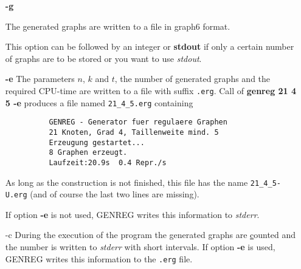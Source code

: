 \documentclass[11pt]{article}
\begin{document}
\begin{itemize}
  as code. 
  To achieve a further compression of the data, we compare
  the code of the next graph to be constructed with the 
  preceeding and find out, in how many entries at the begining
  the two codes are equal. Instead of writing the common
  pieces twice on the file, we only store its length and
  then the differing entries. Thus as first entry of the file
  we always have zero. The 4-regular graphs on 7 vertices
  have the codes 
  
  \hspace{1cm} {\tt 2 3 4 5 3 4 5 6 7 6 7 6 7 7} and

  \hspace{1cm} {\tt 2 3 4 5 3 4 6 5 7 6 7 6 7 7}

  The file {\bf \verb|07_4_3.scd|} consists of 

  \hspace{1cm}{\tt 0 2 3 4 5 3 4 5 6 7 6 7 6 7 7 6 6 5 7 6 7 6 7 7}

  and has length of 24 byte. This kind of compression gets better for
  big $n$ or $t>3$. The program {\em readscd.c}  contains easy functions
  which are able to read shortcode files. 

  This option can be followed by an integer or {\bf stdout} if
  only a certain number of graphs are to be stored or you want to use
  {\em stdout}.  

  \item[\bf -g]

  The generated graphs are written to a file in \underline{g}raph6 format.

  This option can be followed by an integer or {\bf stdout} if
  only a certain number of graphs are to be stored or you want to use
  {\em stdout}.

  \item[\bf -e]
  The parameters $n$, $k$ and $t$, the number of generated graphs 
  and the required CPU-time are written to a file with suffix 
  \verb|.erg|. Call of {\bf genreg 21 4 5 -e} produces a file named
  \verb|21_4_5.erg| containing 
  \begin{verbatim}
          GENREG - Generator fuer regulaere Graphen
          21 Knoten, Grad 4, Taillenweite mind. 5
          Erzeugung gestartet...
          8 Graphen erzeugt.
          Laufzeit:20.9s  0.4 Repr./s \end{verbatim}
  As long as the construction is not finished, this file has the
  name \verb|21_4_5-U.erg| (and of course the last two lines are
  missing).

  If option {\bf -e} is not used, GENREG writes this information
  to {\em stderr}.

  \item[-c]
  During the execution of the program the generated graphs are 
  \underline{c}ounted and the number is written to {\em stderr} with
  short intervals.
  If option {\bf -e} is used, GENREG writes this information
  to the \verb|.erg| file.
\end{itemize}
\end{document}
